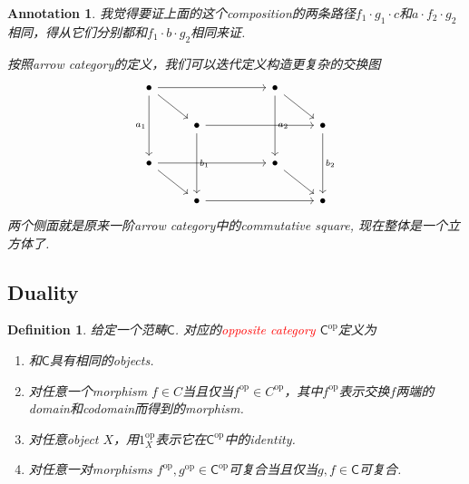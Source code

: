 \documentclass{article}
\newtheorem{definition}[theorem]{Definition}
\newtheorem{annotation}[theorem]{Annotation}
\newcommand*{\cat}[1]{\textsf{#1}\xspace}
\newcommand{\id}{1}
\newcommand{\op}{\textrm{op}}
\newcommand{\redt}[1]{\textcolor{red}{#1}}
\begin{document}
\begin{annotation}
\rm 我觉得要证上面的这个composition的两条路径$f_1 \cdot g_1 \cdot c$和$a\cdot f_2 \cdot g_2$相同，得从它们分别都和$f_1 \cdot b \cdot g_2$相同来证. 

按照arrow category的定义，我们可以迭代定义构造更复杂的交换图
$$
\begin{tikzcd}
\bullet \arrow[rrr] \arrow[rd] \arrow[dd, "a_1"'] &                                       &  & \bullet \arrow[rd] \arrow[dd, "a_2"] &                           \\
                                                  & \bullet \arrow[rrr] \arrow[dd, "b_1"] &  &                                      & \bullet \arrow[dd, "b_2"] \\
\bullet \arrow[rd] \arrow[rrr]                    &                                       &  & \bullet \arrow[rd]                   &                           \\
                                                  & \bullet \arrow[rrr]                   &  &                                      & \bullet                  
\end{tikzcd}
$$
两个侧面就是原来一阶arrow category中的commutative square, 现在整体是一个立方体了. 
\end{annotation}

\newpage
\subsection{Duality}

\begin{definition}
\rm 给定一个范畴$\cat{C}$. 对应的\redt{opposite category} $\cat{C}^\op$定义为
\begin{enumerate}
	\item 和$\cat{C}$具有相同的objects.
	\item 对任意一个morphism $f \in C$当且仅当$f^\op \in C^\op$，其中$f^\op$表示交换$f$两端的domain和codomain而得到的morphism. 
	\item 对任意object $X$，用$\id_X^\op$表示它在$\cat{C}^\op$中的identity.
	\item 对任意一对morphisms $f^\op, g^\op \in \cat{C}^\op$可复合当且仅当$g,f \in \cat{C}$可复合.    
\end{enumerate}
\end{definition}
\end{document}
